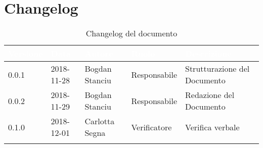 \newpage

\section{Changelog}

\begin{center}
\begin{longtable}[c]{|m{}|m{}|m{}|m{}|p{}|}
\hline
\rowcolor{bluelogo}\textbf{\textcolor{white}{Versione}} & \textbf{\textcolor{white}{Data}} & \textbf{\textcolor{white}{Autore}} & \textbf{\textcolor{white}{Ruolo}} & \textbf{\textcolor{white}{Descrizione}}\\
\hline \hline
\endfirsthead
0.0.1 & 2018-11-28 & Bogdan Stanciu & Responsabile & Strutturazione del Documento \\
\hline
\rowcolor{grigio}0.0.2 & 2018-11-29 & Bogdan Stanciu & Responsabile & Redazione del Documento \\
\hline
0.1.0 & 2018-12-01 & Carlotta Segna & Verificatore & Verifica verbale \\
\hline
\caption{Changelog del documento}
\end{longtable}
\end{center}
